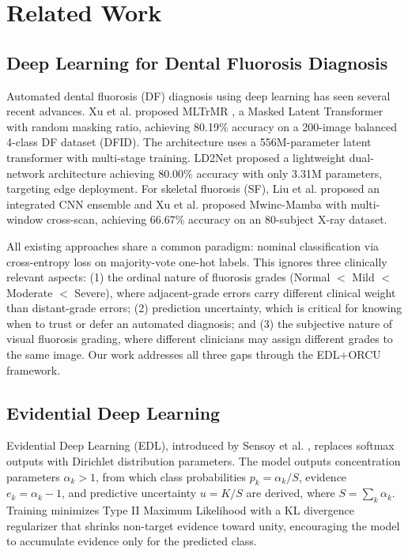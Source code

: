 \section{Related Work}

\subsection{Deep Learning for Dental Fluorosis Diagnosis}

Automated dental fluorosis (DF) diagnosis using deep learning has seen several recent advances. Xu et al. proposed MLTrMR \cite{xu2025mltrmr}, a Masked Latent Transformer with random masking ratio, achieving 80.19\% accuracy on a 200-image balanced 4-class DF dataset (DFID). The architecture uses a 556M-parameter latent transformer with multi-stage training. LD2Net \cite{li2026ld2net} proposed a lightweight dual-network architecture achieving 80.00\% accuracy with only 3.31M parameters, targeting edge deployment. For skeletal fluorosis (SF), Liu et al. \cite{liu2021integrated} proposed an integrated CNN ensemble and Xu et al. \cite{xu2025mwinc} proposed Mwinc-Mamba with multi-window cross-scan, achieving 66.67\% accuracy on an 80-subject X-ray dataset.

All existing approaches share a common paradigm: nominal classification via cross-entropy loss on majority-vote one-hot labels. This ignores three clinically relevant aspects: (1) the ordinal nature of fluorosis grades (Normal $<$ Mild $<$ Moderate $<$ Severe), where adjacent-grade errors carry different clinical weight than distant-grade errors; (2) prediction uncertainty, which is critical for knowing when to trust or defer an automated diagnosis; and (3) the subjective nature of visual fluorosis grading, where different clinicians may assign different grades to the same image. Our work addresses all three gaps through the EDL+ORCU framework.

\subsection{Evidential Deep Learning}

Evidential Deep Learning (EDL), introduced by Sensoy et al. \cite{sensoy2018edl}, replaces softmax outputs with Dirichlet distribution parameters. The model outputs concentration parameters $\alpha_k > 1$, from which class probabilities $p_k = \alpha_k / S$, evidence $e_k = \alpha_k - 1$, and predictive uncertainty $u = K / S$ are derived, where $S = \sum_k \alpha_k$. Training minimizes Type II Maximum Likelihood with a KL divergence regularizer that shrinks non-target evidence toward unity, encouraging the model to accumulate evidence only for the predicted class.

